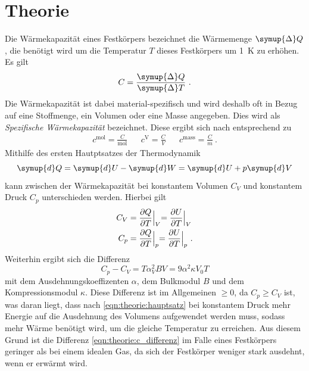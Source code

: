 \section{Theorie}
\label{sec:theorie}

    Die Wärmekapazität eines Festkörpers bezeichnet die Wärmemenge $\symup{\Delta} Q$,
    die benötigt wird um die Temperatur $T$ dieses Festkörpers um \SI{1}{\kelvin} zu erhöhen.
    Es gilt
    \begin{equation*}
        C = \frac{\symup{\Delta}Q}{\symup{\Delta}T} \ .
    \end{equation*}
    Die Wärmekapazität ist dabei material-spezifisch und wird deshalb oft in Bezug auf eine Stoffmenge,
    ein Volumen oder eine Masse angegeben.
    Dies wird als \textit{Spezifische Wärmekapazität} bezeichnet.
    Diese ergibt sich nach \cite{grossmarx} entsprechend zu
    \begin{align*}
        c^\text{mol} = \frac{C}{\si{\mol}} && c^\text{V} = \frac{C}{V} && c^\text{mass} = \frac{C}{m} \ .
    \end{align*}
    Mithilfe des ersten Hautptsatzes der Thermodynamik
    \begin{equation}
        \symup{d}Q = \symup{d}U - \symup{d}W = \symup{d}U + p\symup{d}V
        \label{eqn:theorie:hauptsatz}
    \end{equation}
    kann zwischen der Wärmekapazität bei konstantem Volumen $C_V$ und konstantem Druck $C_p$ unterschieden werden.
    Hierbei gilt
    \begin{align*}
        C_V &= \frac{\partial Q}{\partial T} \Bigl|_V = \frac{\partial U}{\partial T} \Bigl|_V
        \\
        C_p &= \frac{\partial Q}{\partial T} \Bigl|_p = \frac{\partial U}{\partial T} \Bigl|_p \ .
    \end{align*}
    Weiterhin ergibt sich die Differenz
    \begin{equation}
        C_p - C_V = T \alpha^2_V B V = 9 \alpha^2 \kappa V_0 T
        \label{eqn:theorie:c_differenz}
    \end{equation}
    mit dem Ausdehnungskoeffizenten $\alpha$,
    dem Bulkmodul $B$ und dem Kompressionsmodul $\kappa$.
    Diese Differenz ist im Allgemeinen $\geq 0$,
    da $C_p \geq C_V$ ist,
    was daran liegt,
    dass nach \autoref{eqn:theorie:hauptsatz} bei konstantem Druck mehr Energie auf die Ausdehnung des Volumens aufgewendet werden muss,
    sodass mehr Wärme benötigt wird,
    um die gleiche Temperatur zu erreichen.
    Aus diesem Grund ist die Differenz \autoref{eqn:theorie:c_differenz} im Falle eines Festkörpers geringer als bei einem idealen Gas,
    da sich der Festkörper weniger stark ausdehnt,
    wenn er erwärmt wird.

